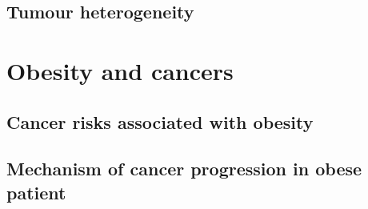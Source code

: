 

\subsection{Tumour heterogeneity}
\label{sub:tumour_heterogeneity}




\section{Obesity and cancers}
\label{sec:obesity_and_cancers}

\subsection{Cancer risks associated with obesity}
\label{sub:cancer_risks_associated_with_obesity}



\subsection{Mechanism of cancer progression in obese patient}
\label{sub:mechanism_of_cancer_progression_in_obese_patient}





